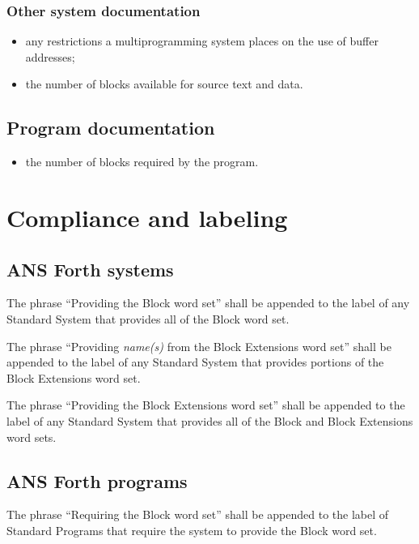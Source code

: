 \subsubsection{Other system documentation} %

\begin{itemize}
\item any restrictions a multiprogramming system places on the use
	of buffer addresses;
\item the number of blocks available for source text and data.
\end{itemize}

\subsection{Program documentation} %

\begin{itemize}
\item the number of blocks required by the program.
\end{itemize}


\section{Compliance and labeling} %

\subsection{ANS Forth systems} %

The phrase ``Providing the Block word set'' shall be appended to
the label of any Standard System that provides all of the Block
word set.

The phrase ``Providing \emph{name(s)} from the Block Extensions
word set'' shall be appended to the label of any Standard System
that provides portions of the Block Extensions word set.

The phrase ``Providing the Block Extensions word set'' shall be
appended to the label of any Standard System that provides all of
the Block and Block Extensions word sets.

\subsection{ANS Forth programs} %

The phrase ``Requiring the Block word set'' shall be appended to
the label of Standard Programs that require the system to provide
the Block word set.

